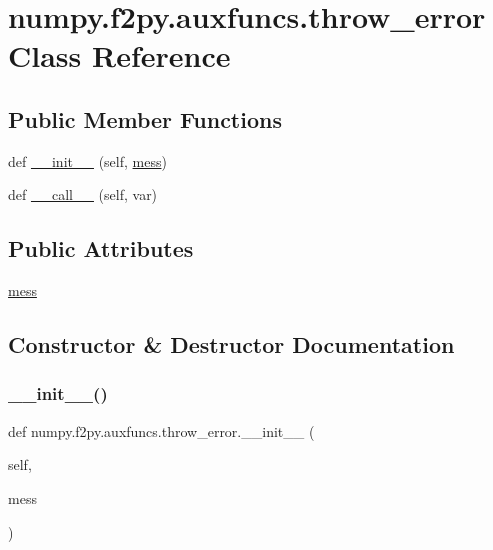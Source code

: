 \hypertarget{classnumpy_1_1f2py_1_1auxfuncs_1_1throw__error}{}\section{numpy.\+f2py.\+auxfuncs.\+throw\+\_\+error Class Reference}
\label{classnumpy_1_1f2py_1_1auxfuncs_1_1throw__error}
\subsection*{Public Member Functions}
\begin{DoxyCompactItemize}
\item 
def \hyperlink{classnumpy_1_1f2py_1_1auxfuncs_1_1throw__error_a6c75c26d07e391723c83369b33220270}{\+\_\+\+\_\+init\+\_\+\+\_\+} (self, \hyperlink{classnumpy_1_1f2py_1_1auxfuncs_1_1throw__error_a2cfa7931627dd19ed3180d834e9c01b8}{mess})
\item 
def \hyperlink{classnumpy_1_1f2py_1_1auxfuncs_1_1throw__error_aa786a374b3826f4a7288fb1a33584d8d}{\+\_\+\+\_\+call\+\_\+\+\_\+} (self, var)
\end{DoxyCompactItemize}
\subsection*{Public Attributes}
\begin{DoxyCompactItemize}
\item 
\hyperlink{classnumpy_1_1f2py_1_1auxfuncs_1_1throw__error_a2cfa7931627dd19ed3180d834e9c01b8}{mess}
\end{DoxyCompactItemize}


\subsection{Constructor \& Destructor Documentation}
\mbox{\label{classnumpy_1_1f2py_1_1auxfuncs_1_1throw__error_a6c75c26d07e391723c83369b33220270}} 
\subsubsection{\texorpdfstring{\+\_\+\+\_\+init\+\_\+\+\_\+()}{\_\_init\_\_()}}
{\footnotesize\ttfamily def numpy.\+f2py.\+auxfuncs.\+throw\+\_\+error.\+\_\+\+\_\+init\+\_\+\+\_\+ (\begin{DoxyParamCaption}\item[{}]{self,  }\item[{}]{mess }\end{DoxyParamCaption})}



